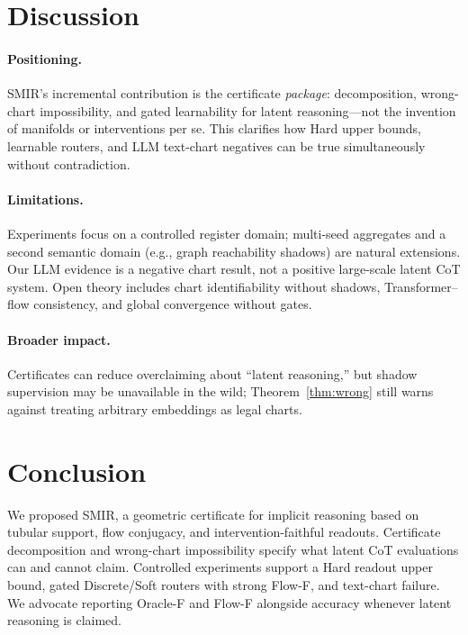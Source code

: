 \documentclass[letterpaper,10pt,twocolumn]{article}
\theoremstyle{definition}
\begin{document}
\section{Discussion}
\label{sec:discuss}

\paragraph{Positioning.}
SMIR's incremental contribution is the certificate \emph{package}: decomposition, wrong-chart impossibility, and gated learnability for latent reasoning---not the invention of manifolds or interventions per se.
This clarifies how Hard upper bounds, learnable routers, and LLM text-chart negatives can be true simultaneously without contradiction.

\paragraph{Limitations.}
Experiments focus on a controlled register domain; multi-seed aggregates and a second semantic domain (e.g., graph reachability shadows) are natural extensions.
Our LLM evidence is a negative chart result, not a positive large-scale latent CoT system.
Open theory includes chart identifiability without shadows, Transformer--flow consistency, and global convergence without gates.

\paragraph{Broader impact.}
Certificates can reduce overclaiming about ``latent reasoning,'' but shadow supervision may be unavailable in the wild; Theorem~\ref{thm:wrong} still warns against treating arbitrary embeddings as legal charts.

\section{Conclusion}
\label{sec:conc}

We proposed SMIR, a geometric certificate for implicit reasoning based on tubular support, flow conjugacy, and intervention-faithful readouts.
Certificate decomposition and wrong-chart impossibility specify what latent CoT evaluations can and cannot claim.
Controlled experiments support a Hard readout upper bound, gated Discrete/Soft routers with strong Flow-F, and text-chart failure.
We advocate reporting Oracle-F and Flow-F alongside accuracy whenever latent reasoning is claimed.
\end{document}
